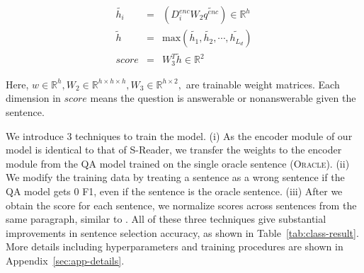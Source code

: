\documentclass[11pt,a4paper]{article}
\newcommand{\oracleshort}{(\textsc{Oracle})}
\newcommand{\reduce}{\vspace*{-3pt}}
\begin{document}
\vspace{-2cm}
\begin{eqnarray}
     {\tilde {h_i}} &=& (D^{enc}_i{W_2}{\tilde {q^{enc}}}) \in \mathbb{R}^{h} \\
     {\tilde {h}} &=& \mathrm{max}({\tilde {h_1}}, {\tilde {h_2}}, \cdots, {\tilde {h_{L_d}}})\\
    score &=& {W_3^T}{\tilde {h}} \in \mathbb{R}^2
\end{eqnarray}

Here, $w \in \mathbb{R}^h, W_2 \in \mathbb{R}^{h \times h \times h}, W_3 \in \mathbb{R}^{h \times 2}, $ are trainable weight matrices. Each dimension in $score$ means the question is answerable or nonanswerable given the sentence.






\begin{table*}[ht]
\begin{center}
\end{center}
\reduce
\caption{ Dataset used for experiments. `N word', `N sent' and `N doc' refer to the average number of words, sentences and documents, respectively.
All statistics are calculated on the development set. 
For SQuAD-Open, since the task is in open-domain, we calculated the statistics based on top 10 documents from Document Retriever in DrQA~\citep{squad-open}.} 
\label{tab:dataset}
\vspace{-8pt}
\end{table*} 
We introduce 3 techniques to train the model.
(i) As the encoder module of our model is identical to that of S-Reader, we transfer the weights to the encoder module from the QA model trained on the single oracle sentence \oracleshort.
(ii) We modify the training data by treating a sentence as a wrong sentence if the QA model gets $0$ F1, even if the sentence is the oracle sentence.
(iii) After we obtain the score for each sentence, we normalize scores across sentences from the same paragraph, similar to \citet{simple-and-effective}. 
All of these three techniques give substantial improvements in sentence selection accuracy, as shown in Table~\ref{tab:class-result}.
More details including hyperparameters and training procedures are shown in Appendix~\ref{sec:app-details}.
\end{document}
